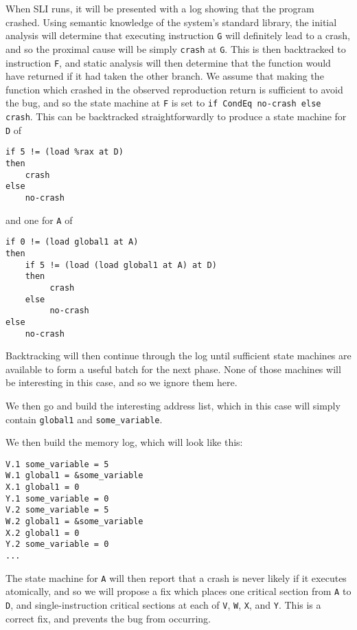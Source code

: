\documentclass[10pt,twocolumn,preprint,natbib,authoryear]{sigplanconf}
\begin{document}
When SLI runs, it will be presented with a log showing that the
program crashed.  Using semantic knowledge of the system's standard
library, the initial analysis will determine that executing
instruction \verb|G| will definitely lead to a crash, and so the
proximal cause will be simply \verb|crash| at \verb|G|.  This is then
backtracked to instruction \verb|F|, and static analysis will then
determine that the function would have returned if it had taken the
other branch.  We assume that making the function which crashed in the
observed reproduction return is sufficient to avoid the bug, and so
the state machine at \verb|F| is set to
\verb|if CondEq no-crash else crash|.  This can be backtracked
straightforwardly to produce a state machine for \verb|D| of

\begin{verbatim}
if 5 != (load %rax at D)
then
    crash
else
    no-crash
\end{verbatim}

and one for \verb|A| of

\begin{verbatim}
if 0 != (load global1 at A)
then
    if 5 != (load (load global1 at A) at D)
    then
         crash
    else
         no-crash
else
    no-crash
\end{verbatim}

Backtracking will then continue through the log until sufficient state
machines are available to form a useful batch for the next phase.
None of those machines will be interesting in this case, and so we
ignore them here.

We then go and build the interesting address list, which in this case
will simply contain \verb|global1| and \verb|some_variable|.

We then build the memory log, which will look like this:

\begin{verbatim}
V.1 some_variable = 5
W.1 global1 = &some_variable
X.1 global1 = 0
Y.1 some_variable = 0
V.2 some_variable = 5
W.2 global1 = &some_variable
X.2 global1 = 0
Y.2 some_variable = 0
...
\end{verbatim}

The state machine for \verb|A| will then report that a crash is never
likely if it executes atomically, and so we will propose a fix which
places one critical section from \verb|A| to \verb|D|, and
single-instruction critical sections at each of \verb|V|, \verb|W|,
\verb|X|, and \verb|Y|.  This is a correct fix, and prevents the bug
from occurring.
\end{document}
